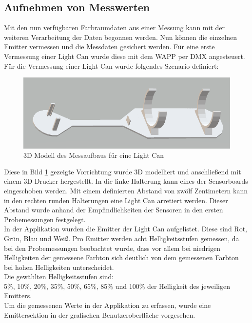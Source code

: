 \documentclass[11pt]{scrartcl}
\begin{document}
\subsection{Aufnehmen von Messwerten}
Mit den nun verfügbaren Farbraumdaten aus einer Messung kann mit der weiteren Verarbeitung der Daten begonnen werden. Nun können die einzelnen
Emitter vermessen und die Messdaten gesichert werden. Für eine erste Vermessung einer Light Can wurde diese mit dem WAPP per DMX angesteuert.
Für die Vermessung einer Light Can wurde folgendes Szenario definiert:
\begin{figure}[H]
    \begin{center}
        \includegraphics[width=\textwidth]{images/light_can_holder_3d.png}
    \end{center}
    \caption{3D Modell des Messaufbaus für eine Light Can}\label{fig:3DCanHolder}
\end{figure}
\noindent
Diese in Bild \ref{fig:3DCanHolder} gezeigte Vorrichtung wurde 3D modelliert und anschließend mit einem 3D Drucker hergestellt. In die linke
Halterung kann eines der Sensorboards eingeschoben werden. Mit einem definierten Abstand von zwölf Zentimetern kann in den rechten runden Halterungen
eine Light Can arretiert werden. Dieser Abstand wurde anhand der Empfindlichkeiten der Sensoren in den ersten Probemessungen festgelegt.\\
In der Applikation wurden die Emitter der Light Can aufgelistet. Diese sind Rot, Grün, Blau und Weiß. Pro Emitter werden acht Helligkeitsstufen
gemessen, da bei den Probemessungen beobachtet wurde, dass vor allem bei niedrigen Helligkeiten der gemessene Farbton sich deutlich von dem
gemessenen Farbton bei hohen Helligkeiten unterscheidet.\\
Die gewählten Helligkeitsstufen sind:\\
5\%, 10\%, 20\%, 35\%, 50\%, 65\%, 85\% und 100\% der Helligkeit des jeweiligen Emitters.\\
Um die gemessenen Werte in der Applikation zu erfassen, wurde eine Emittersektion in der grafischen Benutzeroberfläche vorgesehen.
\end{document}
